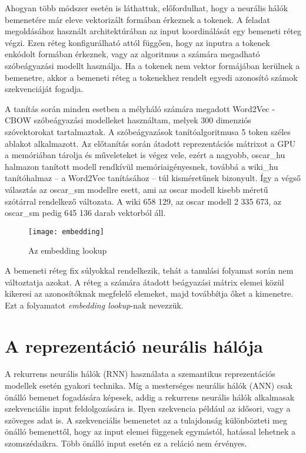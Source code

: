 Ahogyan több módszer esetén is láthattuk, előfordulhat, hogy a neurális hálók bemenetére már eleve vektorizált formában érkeznek a tokenek. A feladat megoldásához használt architektúrában az input koordinálását egy bemeneti réteg végzi. Ezen réteg konfigurálható attól függően, hogy az inputra a tokenek enkódolt formában érkeznek, vagy az algoritmus a számára megadható szóbeágyazási modellt használja. Ha a tokenek nem vektor formájában kerülnek a bemenetre, akkor a bemeneti réteg a tokenekhez rendelt egyedi azonosító számok szekvenciáját fogadja.

A tanítás során minden esetben a mélyháló számára megadott Word2Vec - CBOW szóbeágyazási modelleket használtam, melyek 300 dimenziós szóvektorokat tartalmaztak. A szóbeágyazások tanítóalgoritmusa 5 token széles ablakot alkalmazott. Az előtanítás során átadott reprezentációs mátrixot a GPU a memóriában tárolja és műveleteket is végez vele, ezért a nagyobb, oscar\_hu halmazon tanított modell rendkívül memóriaigényesnek, továbbá a wiki\_hu tanítóhalmaz – a Word2Vec tanításához – túl kisméretűnek bizonyult. Így a végső választás az oscar\_sm modellre esett, ami az oscar modell kisebb méretű szótárral rendelkező változata. A wiki 658 129, az oscar modell 2 335 673, az oscar\_sm pedig 645 136 darab vektorból áll.

\begin{figure}[H]
	\centering
	\texttt{[image: embedding]}
	\caption{Az embedding lookup}
\end{figure}

A bemeneti réteg fix súlyokkal rendelkezik, tehát a tanulási folyamat során nem változtatja azokat. A réteg a számára átadott beágyazási mátrix elemei közül kikeresi az azonosítóknak megfelelő elemeket, majd továbbítja őket a kimenetre. Ezt a folyamatot \textit{embedding lookup}-nak nevezzük.

\section{A reprezentáció neurális hálója}

A rekurrens neurális hálók (RNN) használata a szemantikus reprezentációs modellek esetén gyakori technika. Míg a mesterséges neurális hálók (ANN) csak önálló bemenet fogadására képesek, addig a rekurrens neurális hálók alkalmasak szekvenciális input feldolgozására is. Ilyen szekvencia például az idősori, vagy a szöveges adat is. A szekvenciális bemenetet az a tulajdonság különbözteti meg önálló bemenettől, hogy az input elemei függenek egymástól, hatással lehetnek a szomszédaikra. Több önálló input esetén ez a reláció nem érvényes.

